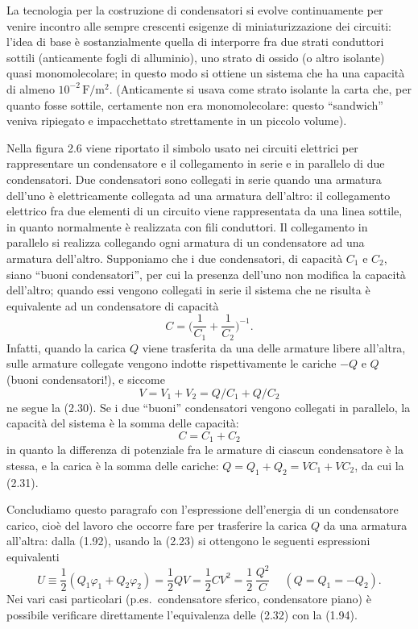 La tecnologia per la costruzione di condensatori si evolve continuamente per
venire incontro alle sempre crescenti esigenze di miniaturizzazione dei
circuiti: l'idea di base \`e sostanzialmente quella di interporre fra due strati
conduttori sottili (anticamente fogli di alluminio), uno strato di ossido (o
altro isolante) quasi monomolecolare; in questo modo si ottiene un sistema che
ha una capacit\`a di almeno $10^{-2}\,\mathrm F/\mathrm m^2$. (Anticamente si
usava come strato isolante la carta che, per quanto fosse sottile, certamente
non era monomolecolare: questo ``sandwich'' veniva ripiegato e impacchettato
strettamente in un piccolo volume).

Nella figura 2.6 viene riportato il simbolo usato nei circuiti elettrici per
rappresentare un condensatore e il collegamento in serie e in parallelo di due
condensatori. Due condensatori sono collegati in serie quando una armatura
dell'uno \`e elettricamente collegata ad una armatura dell'altro: il
collegamento elettrico fra due elementi di un circuito viene rappresentata da
una linea sottile, in quanto normalmente \`e realizzata con fili conduttori. Il
collegamento in parallelo si realizza collegando ogni armatura di un
condensatore ad una armatura dell'altro.
Supponiamo che i due condensatori, di capacit\`a $C_1$ e $C_2$, siano ``buoni
condensatori'', per cui la presenza dell'uno non modifica la capacit\`a
dell'altro; quando essi vengono collegati in serie il sistema che ne risulta \`e
equivalente ad un condensatore di capacit\`a
\begin{equation}
  C=\Big(\frac{1}{C_1}+\frac{1}{C_2}\Big)^{-1}.
  \tag{2.30}
\end{equation}
Infatti, quando la carica $Q$ viene trasferita da una delle armature libere
all'altra, sulle armature collegate vengono indotte rispettivamente le cariche
$-Q$ e $Q$ (buoni condensatori!), e siccome
\[
  V=V_1+V_2=Q/C_1+Q/C_2
\]
ne segue la (2.30).
Se i due ``buoni'' condensatori vengono collegati in parallelo, la capacit\`a
del sistema \`e la somma delle capacit\`a:
\begin{equation}
  C=C_1+C_2
  \tag{2.31}
\end{equation}
in quanto la differenza di potenziale fra le armature di ciascun condensatore
\`e la stessa, e la carica \`e la somma delle cariche: $Q=Q_1+Q_2=VC_1+VC_2$, da
cui la (2.31).

Concludiamo questo paragrafo con l'espressione dell'energia di un condensatore
carico, cio\`e del lavoro che occorre fare per trasferire la carica $Q$ da una
armatura all'altra: dalla (1.92), usando la (2.23) si ottengono le seguenti
espressioni equivalenti
\begin{equation}
  U\equiv\frac12(Q_1\varphi_1+Q_2\varphi_2)
  =\frac12QV=\frac12CV^2=\frac12\,\frac{Q^2}{C}\quad\ (Q=Q_1=-Q_2).
  \tag{2.32}
\end{equation}
Nei vari casi particolari (p.es.\ condensatore sferico, condensatore piano) \`e
possibile verificare direttamente l'equivalenza delle (2.32) con la (1.94).


